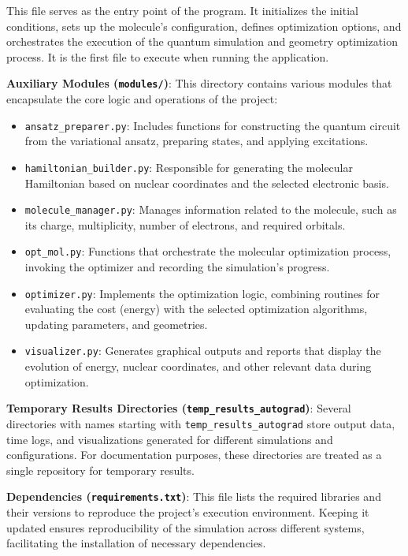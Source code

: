This file serves as the entry point of the program. It initializes the initial conditions, sets up the molecule's configuration, defines optimization options, and orchestrates the execution of the quantum simulation and geometry optimization process. It is the first file to execute when running the application.

\textbf{Auxiliary Modules (\texttt{modules/})}:  
This directory contains various modules that encapsulate the core logic and operations of the project:
\begin{itemize}
    \item \texttt{ansatz\_preparer.py}: Includes functions for constructing the quantum circuit from the variational ansatz, preparing states, and applying excitations.
    \item \texttt{hamiltonian\_builder.py}: Responsible for generating the molecular Hamiltonian based on nuclear coordinates and the selected electronic basis.
    \item \texttt{molecule\_manager.py}: Manages information related to the molecule, such as its charge, multiplicity, number of electrons, and required orbitals.
    \item \texttt{opt\_mol.py}: Functions that orchestrate the molecular optimization process, invoking the optimizer and recording the simulation's progress.
    \item \texttt{optimizer.py}: Implements the optimization logic, combining routines for evaluating the cost (energy) with the selected optimization algorithms, updating parameters, and geometries.
    \item \texttt{visualizer.py}: Generates graphical outputs and reports that display the evolution of energy, nuclear coordinates, and other relevant data during optimization.
\end{itemize}

\textbf{Temporary Results Directories (\texttt{temp\_results\_autograd})}:  
    Several directories with names starting with \texttt{temp\_results\_autograd} store output data, time logs, and visualizations generated for different simulations and configurations. For documentation purposes, these directories are treated as a single repository for temporary results.

\textbf{Dependencies (\texttt{requirements.txt})}:  
    This file lists the required libraries and their versions to reproduce the project's execution environment. Keeping it updated ensures reproducibility of the simulation across different systems, facilitating the installation of necessary dependencies.


